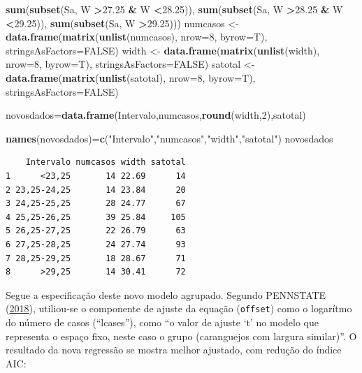\documentclass[12pt,brazil,oneside]{book}
\newenvironment{Shaded}{\begin{snugshade}}{\end{snugshade}}
\newcommand{\DataTypeTok}[1]{\textcolor[rgb]{0.13,0.29,0.53}{#1}}
\newcommand{\DecValTok}[1]{\textcolor[rgb]{0.00,0.00,0.81}{#1}}
\newcommand{\FloatTok}[1]{\textcolor[rgb]{0.00,0.00,0.81}{#1}}
\newcommand{\KeywordTok}[1]{\textcolor[rgb]{0.13,0.29,0.53}{\textbf{#1}}}
\newcommand{\NormalTok}[1]{#1}
\newcommand{\OperatorTok}[1]{\textcolor[rgb]{0.81,0.36,0.00}{\textbf{#1}}}
\newcommand{\OtherTok}[1]{\textcolor[rgb]{0.56,0.35,0.01}{#1}}
\newcommand{\StringTok}[1]{\textcolor[rgb]{0.31,0.60,0.02}{#1}}
\begin{document}
\begin{Shaded}
\begin{Highlighting}[]
              \KeywordTok{sum}\NormalTok{(}\KeywordTok{subset}\NormalTok{(Sa, W }\OperatorTok{>}\FloatTok{27.25} \OperatorTok{&}\StringTok{ }\NormalTok{W }\OperatorTok{<}\FloatTok{28.25}\NormalTok{)),}
              \KeywordTok{sum}\NormalTok{(}\KeywordTok{subset}\NormalTok{(Sa, W }\OperatorTok{>}\FloatTok{28.25} \OperatorTok{&}\StringTok{ }\NormalTok{W }\OperatorTok{<}\FloatTok{29.25}\NormalTok{)),}
              \KeywordTok{sum}\NormalTok{(}\KeywordTok{subset}\NormalTok{(Sa, W }\OperatorTok{>}\FloatTok{29.25}\NormalTok{)))}
\NormalTok{numcasos <-}\StringTok{ }\KeywordTok{data.frame}\NormalTok{(}\KeywordTok{matrix}\NormalTok{(}\KeywordTok{unlist}\NormalTok{(numcasos), }\DataTypeTok{nrow=}\DecValTok{8}\NormalTok{, }\DataTypeTok{byrow=}\NormalTok{T),}
                       \DataTypeTok{stringsAsFactors=}\OtherTok{FALSE}\NormalTok{)}
\NormalTok{width <-}\StringTok{ }\KeywordTok{data.frame}\NormalTok{(}\KeywordTok{matrix}\NormalTok{(}\KeywordTok{unlist}\NormalTok{(width), }\DataTypeTok{nrow=}\DecValTok{8}\NormalTok{, }\DataTypeTok{byrow=}\NormalTok{T),}
                    \DataTypeTok{stringsAsFactors=}\OtherTok{FALSE}\NormalTok{)}
\NormalTok{satotal <-}\StringTok{ }\KeywordTok{data.frame}\NormalTok{(}\KeywordTok{matrix}\NormalTok{(}\KeywordTok{unlist}\NormalTok{(satotal), }\DataTypeTok{nrow=}\DecValTok{8}\NormalTok{, }\DataTypeTok{byrow=}\NormalTok{T),}
                      \DataTypeTok{stringsAsFactors=}\OtherTok{FALSE}\NormalTok{)}

\NormalTok{novosdados=}\KeywordTok{data.frame}\NormalTok{(Intervalo,numcasos,}\KeywordTok{round}\NormalTok{(width,}\DecValTok{2}\NormalTok{),satotal)}

\KeywordTok{names}\NormalTok{(novosdados)=}\KeywordTok{c}\NormalTok{(}\StringTok{"Intervalo"}\NormalTok{,}\StringTok{"numcasos"}\NormalTok{,}\StringTok{"width"}\NormalTok{,}\StringTok{"satotal"}\NormalTok{)}
\NormalTok{novosdados}
\end{Highlighting}
\end{Shaded}

\begin{verbatim}
    Intervalo numcasos width satotal
1      <23,25       14 22.69      14
2 23,25-24,25       14 23.84      20
3 24,25-25,25       28 24.77      67
4 25,25-26,25       39 25.84     105
5 26,25-27,25       22 26.79      63
6 27,25-28,25       24 27.74      93
7 28,25-29,25       18 28.67      71
8      >29,25       14 30.41      72
\end{verbatim}

Segue a especificação deste novo modelo agrupado. Segundo PENNSTATE
(\protect\hyperlink{ref-penn2018}{2018}), utiliou-se o componente de
ajuste da equação (\texttt{offset}) como o logarítmo do número de casos
(``lcases''), como ``o valor de ajuste `t' no modelo que representa o
espaço fixo, neste caso o grupo (caranguejos com largura similar)''. O
resultado da nova regressão se mostra melhor ajustado, com redução do
índice AIC:
\end{document}
